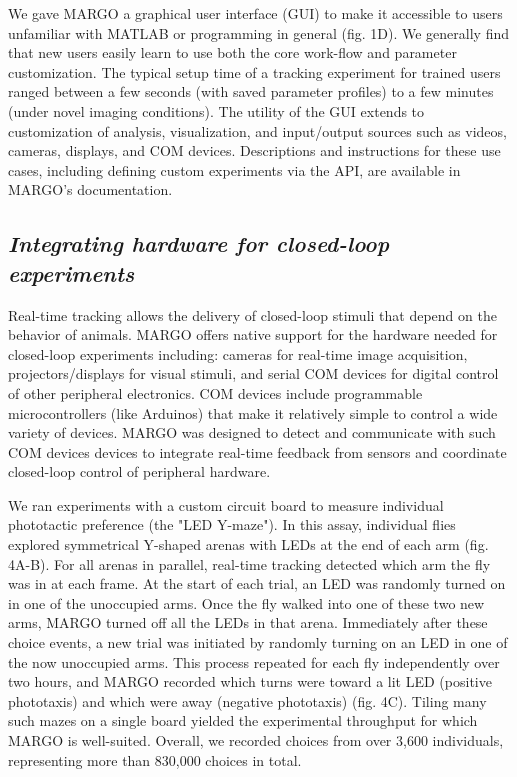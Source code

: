 \documentclass[10pt]{article}
\begin{document}
\begin{multicols}{2}
We gave MARGO a graphical user interface (GUI) to make it accessible to users unfamiliar with MATLAB or programming in general (fig. 1D). We generally find that new users easily learn to use both the core work-flow and parameter customization. The typical setup time of a tracking experiment for trained users ranged between a few seconds (with saved parameter profiles) to a few minutes (under novel imaging conditions). The utility of the GUI extends to customization of analysis, visualization, and input/output sources such as videos, cameras, displays, and COM devices. Descriptions and instructions for these use cases, including defining custom experiments via the API, are available in MARGO's documentation.


\subsection*{\textit{Integrating hardware for closed-loop experiments}}

Real-time tracking allows the delivery of closed-loop stimuli that depend on the behavior of animals. MARGO offers native support for the hardware needed for closed-loop experiments including: cameras for real-time image acquisition, projectors/displays for visual stimuli, and serial COM devices for digital control of other peripheral electronics. COM devices include programmable microcontrollers (like Arduinos) that make it relatively simple to control a wide variety of devices. MARGO was designed to detect and communicate with such COM devices devices to integrate real-time feedback from sensors and coordinate closed-loop control of peripheral hardware. 

We ran experiments with a custom circuit board to measure individual phototactic preference (the "LED Y-maze"). In this assay, individual flies explored symmetrical Y-shaped arenas with LEDs at the end of each arm (fig. 4A-B). For all arenas in parallel, real-time tracking detected which arm the fly was in at each frame. At the start of each trial, an LED was randomly turned on in one of the unoccupied arms. Once the fly walked into one of these two new arms, MARGO turned off all the LEDs in that arena. Immediately after these choice events, a new trial was initiated by randomly turning on an LED in one of the now unoccupied arms. This process repeated for each fly independently over two hours, and MARGO recorded which turns were toward a lit LED (positive phototaxis) and which were away (negative phototaxis) (fig. 4C). Tiling many such mazes on a single board yielded the experimental throughput for which MARGO is well-suited. Overall, we recorded choices from over 3,600 individuals, representing more than 830,000 choices in total.


\end{multicols}
\end{document}
